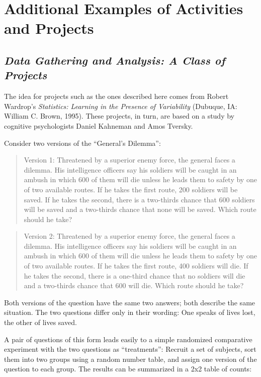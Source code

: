 \documentclass[twoside,openany]{tufte-book}
\begin{document}
\section{\textbf{Additional Examples of Activities and Projects}}

\subsection{\textbf{\textit{Data Gathering and Analysis:  A Class of Projects}}}
The idea for projects such as the ones described here comes from Robert Wardrop's \textit{Statistics:  Learning in the Presence of Variability} (Dubuque, IA:  William C. Brown, 1995). These projects, in turn, are based on a study by cognitive psychologists Daniel Kahneman and Amos Tversky.

Consider two versions of the ``General's Dilemma'':

\begin{quotation}
Version 1:  Threatened by a superior enemy force, the general faces a dilemma. His intelligence officers say his soldiers will be caught in an ambush in which 600 of them will die unless he leads them to safety by one of two available routes.  If he takes the first route, 200 soldiers will be saved.  If he takes the second, there is a two-thirds chance that 600 soldiers will be saved and a two-thirds chance that none will be saved.  Which route should he take?
\end{quotation}

\begin{quotation}
Version 2:  Threatened by a superior enemy force, the general faces a dilemma.  His intelligence officers say his soldiers will be caught in an ambush in which 600 of them will die unless he leads them to safety by one of two available routes.  If he takes the first route, 400 soldiers will die.  If he takes the second, there is a one-third chance that no soldiers will die and a two-thirds chance that 600 will die.  Which route should he take?
\end{quotation}

Both versions of the question have the same two answers; both describe the same situation.  The two questions differ only in their wording:  One speaks of lives lost, the other of lives saved.  

A pair of questions of this form leads easily to a simple randomized comparative experiment with the two questions as ``treatments'':  Recruit a set of subjects, sort them into two groups using a random number table, and assign one version of the question to each group.  The results can be summarized in a 2x2 table of counts:
\end{document}
